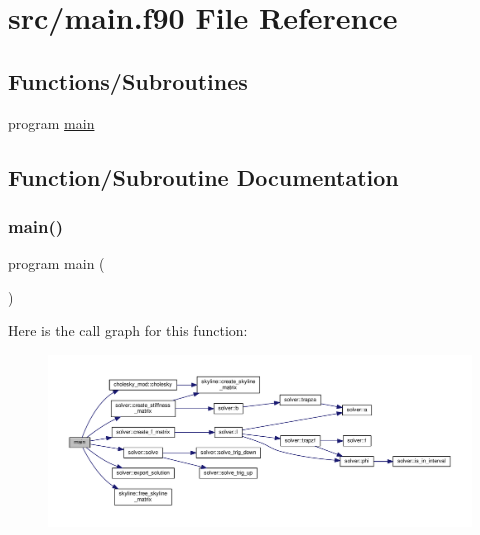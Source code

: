 \hypertarget{main_8f90}{}\section{src/main.f90 File Reference}
\label{main_8f90}
\subsection*{Functions/\+Subroutines}
\begin{DoxyCompactItemize}
\item 
program \hyperlink{main_8f90_a8ec2266d83cd6c0b762cbcbc92c0af3d}{main}
\end{DoxyCompactItemize}


\subsection{Function/\+Subroutine Documentation}
\mbox{\label{main_8f90_a8ec2266d83cd6c0b762cbcbc92c0af3d}} 
\subsubsection{\texorpdfstring{main()}{main()}}
{\footnotesize\ttfamily program main (\begin{DoxyParamCaption}{ }\end{DoxyParamCaption})}

Here is the call graph for this function\+:
\nopagebreak
\begin{figure}[H]
\begin{center}
\leavevmode
\includegraphics[width=350pt]{main_8f90_a8ec2266d83cd6c0b762cbcbc92c0af3d_cgraph}
\end{center}
\end{figure}

